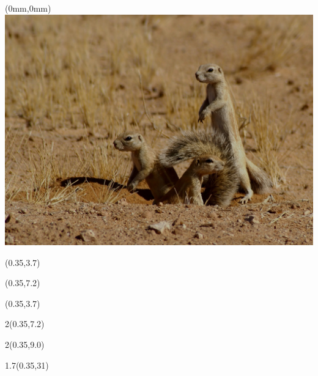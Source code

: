 \begin{textblock*}{\paperwidth}(0mm,0mm)
  \includegraphics[height=\imageheight,%
                   width=\paperwidth,%
                   trim=555 185 251 0,clip]{images/Xerus_inauris_1}
\end{textblock*}

\begin{textblock*}{\paperwidth}(0.35\TPHorizModule,3.7\TPVertModule)
  \textcolor{black!10}{\titlefmt}
\end{textblock*}

\begin{textblock*}{\paperwidth}(0.35\TPHorizModule,7.2\TPVertModule)
  \textcolor{black!10}{\authorfmt}
\end{textblock*}

\null\cleardoublepage


\begin{textblock*}{\paperwidth}(0.35\TPHorizModule,3.7\TPVertModule)
  \titlefmt
\end{textblock*}

\begin{textblock*}{2\TPHorizModule}(0.35\TPHorizModule,7.2\TPVertModule)
  \authorfmt
\end{textblock*}

\begin{textblock*}{2\TPHorizModule}(0.35\TPHorizModule,9.0\TPVertModule)
  \affiliation
\end{textblock*}

\begin{textblock*}{1.7\TPHorizModule}(0.35\TPHorizModule,31\TPVertModule)
  \edition
\end{textblock*}
\endgroup

